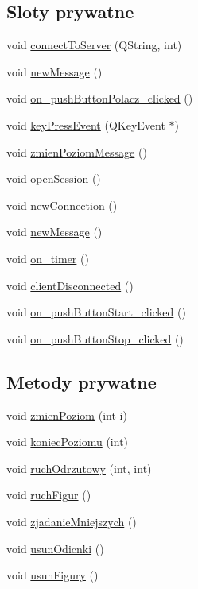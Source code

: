 \subsection*{Sloty prywatne}
\begin{DoxyCompactItemize}
\item 
void \hyperlink{classMainWindow_aeef45c5364f5d7843a260b01cf94f22e}{connect\-To\-Server} (Q\-String, int)
\item 
void \hyperlink{classMainWindow_ae426c78e710d74fa6cc67b0d73ade293}{new\-Message} ()
\item 
void \hyperlink{classMainWindow_a2d0da471c4fe51fc90f1079d856db068}{on\-\_\-push\-Button\-Polacz\-\_\-clicked} ()
\item 
void \hyperlink{classMainWindow_a6b8e934fca603cf7678eabb9a6dfc709}{key\-Press\-Event} (Q\-Key\-Event $\ast$)
\item 
void \hyperlink{classMainWindow_a47b54ea4678d72f712370f550634dfac}{zmien\-Poziom\-Message} ()
\item 
void \hyperlink{classMainWindow_a9abc4d8b5fac6ef7ad91ccd1181b21a8}{open\-Session} ()
\item 
void \hyperlink{classMainWindow_ade49de88616301ebc06e28993164a183}{new\-Connection} ()
\item 
void \hyperlink{classMainWindow_ae426c78e710d74fa6cc67b0d73ade293}{new\-Message} ()
\item 
void \hyperlink{classMainWindow_aef52274d67fbe13062dafd43e27529cb}{on\-\_\-timer} ()
\item 
void \hyperlink{classMainWindow_aa4f477acccb935dc77109944c036c66e}{client\-Disconnected} ()
\item 
void \hyperlink{classMainWindow_a7a57f41cd36b4221181dc661a69954bf}{on\-\_\-push\-Button\-Start\-\_\-clicked} ()
\item 
void \hyperlink{classMainWindow_a95ec84452d77bf97d2a16f3d9c6ea8b8}{on\-\_\-push\-Button\-Stop\-\_\-clicked} ()
\end{DoxyCompactItemize}
\subsection*{Metody prywatne}
\begin{DoxyCompactItemize}
\item 
void \hyperlink{classMainWindow_a2d51371a2ba5783e209e4973d66968a9}{zmien\-Poziom} (int i)
\item 
void \hyperlink{classMainWindow_a28c4dda2a0ac0872677bcd088ec10258}{koniec\-Poziomu} (int)
\item 
void \hyperlink{classMainWindow_a817826befb881a9136a1d76dc64f8a67}{ruch\-Odrzutowy} (int, int)
\item 
void \hyperlink{classMainWindow_a8217ee19e4707d2ceea1ca62521806b7}{ruch\-Figur} ()
\item 
void \hyperlink{classMainWindow_a6c5e5435014fa2b8b1a30e3d5375f6af}{zjadanie\-Mniejszych} ()
\item 
void \hyperlink{classMainWindow_a3cf5b16f1c7da3d94cfb61fb8925871e}{usun\-Odicnki} ()
\item 
void \hyperlink{classMainWindow_af892d930f6529eb2831d5b05634a1dab}{usun\-Figury} ()
\end{DoxyCompactItemize}
